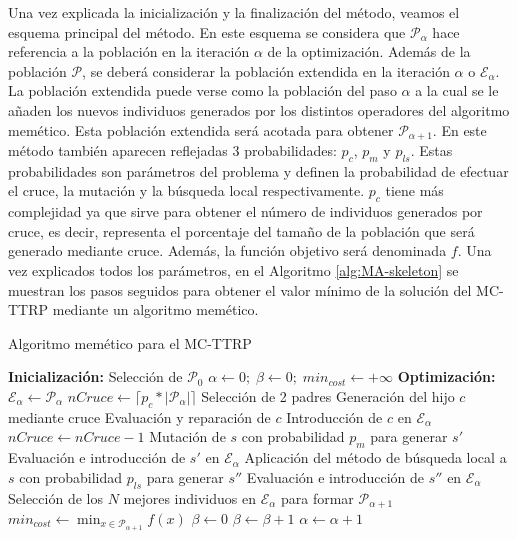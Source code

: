 Una vez explicada la inicialización y la finalización del método, veamos el esquema principal del método. En este esquema se considera que $\mathscr{P}_\alpha$ hace referencia a la población en la iteración $\alpha$ de la optimización. Además de la población $\mathscr{P}$, se deberá considerar la población extendida en la iteración $\alpha$ o $\mathscr{E}_\alpha$. La población extendida puede verse como la población del paso $\alpha$ a la cual se le añaden los nuevos individuos generados por los distintos operadores del algoritmo memético. Esta población extendida será acotada para obtener $\mathscr{P}_{\alpha+1}$. En este método también aparecen reflejadas 3 probabilidades: $p_c$, $p_m$ y $p_{ls}$. Estas probabilidades son parámetros del problema y definen la probabilidad de efectuar el cruce, la mutación y la búsqueda local respectivamente. $p_c$ tiene más complejidad ya que sirve para obtener el número de individuos generados por cruce, es decir, representa el porcentaje del tamaño de la población que será generado mediante cruce. Además, la función objetivo será denominada $f$. Una vez explicados todos los parámetros, en el Algoritmo \ref{alg:MA-skeleton} se muestran los pasos seguidos para obtener el valor mínimo de la solución del MC-TTRP mediante un algoritmo memético.

\begin{algorithm}[!t]
    \caption{Algoritmo memético para el MC-TTRP}
    \label{alg:MA-skeleton}
    \begin{algorithmic}[1]
        \State \textbf{Inicialización:}
        \State Selección de $\mathscr{P}_0$
        \State $\alpha\leftarrow0;\;\beta\leftarrow 0;\;min_{cost}\leftarrow+\infty$
        \State \textbf{Optimización:}
            \State $\mathscr{E}_\alpha\leftarrow\mathscr{P}_\alpha$
            \State $nCruce\leftarrow \lceil p_c*|\mathscr{P}_\alpha|\rceil$
                \State Selección de 2 padres
                \State Generación del hijo $c$ mediante cruce
                \State Evaluación y reparación de $c$
                \State Introducción de $c$ en $\mathscr{E}_\alpha$
                \State $nCruce \leftarrow nCruce -1$
            \EndWhile
                \State Mutación de $s$ con probabilidad $p_m$ para generar $s'$
                \State Evaluación e introducción de $s'$ en $\mathscr{E}_{\alpha}$
                \State Aplicación del método de búsqueda local a $s$ con probabilidad $p_{ls}$ para generar $s''$
                \State Evaluación e introducción de $s''$ en $\mathscr{E}_{\alpha}$
            \EndFor
            \State Selección de los $N$ mejores individuos en $\mathscr{E}_\alpha$ para formar $\mathscr{P}_{\alpha+1}$
                \State $min_{cost}\leftarrow\min_{x\in\mathscr{P}_{\alpha+1}}f(x)$
                \State $\beta\leftarrow 0$
            \Else
                \State $\beta\leftarrow\beta+1$
            \EndIf
            \State $\alpha\leftarrow\alpha+1$
        \EndWhile
    \end{algorithmic}
\end{algorithm}

